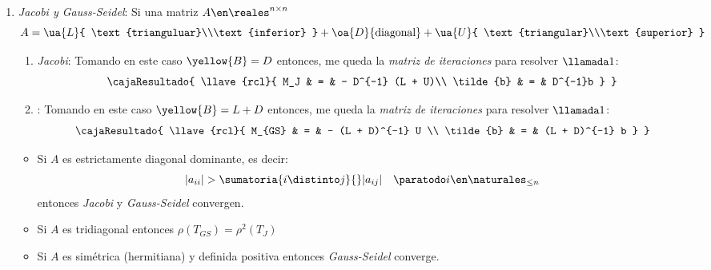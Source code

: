 \begin{enumerate}[label=\tiny\purple{\faIcon{snowman}}]
  \item \textit{Jacobi y Gauss-Seidel}:
        Si una matriz $A \en \reales^{n \times n}$
        $$
          A = \ua{L}{
            \text{trianguluar}\\\text{inferior}
          } +
          \oa{D}{
            \text{diagonal}
          } +
          \ua{U}{
            \text{triangular}\\\text{superior}
          }
        $$

        \begin{enumerate}[label=\tiny\violet{\faIcon{pray})}]

          \item \textit{Jacobi}: Tomando en este caso $\yellow{B} = D$
                entonces, me queda la \textit{matriz de iteraciones} para resolver $\llamada1$:
                $$
                  \cajaResultado{
                    \llave{rcl}{
                      M_J & = & - D^{-1} (L + U)\\
                      \tilde{b}   & = & D^{-1}b
                    }
                  }
                $$

          \item {}: Tomando en este caso $\yellow{B} = L + D$
                entonces, me queda la \textit{matriz de iteraciones} para resolver $\llamada1$:
                $$
                  \cajaResultado{
                    \llave{rcl}{
                      M_{GS} & = & - (L + D)^{-1} U \\
                      \tilde{b} & = & (L + D)^{-1} b
                    }
                  }
                $$
        \end{enumerate}

        \begin{itemize}
          \item Si $A$ es estrictamente diagonal dominante, es decir:
                $$
                  |a_{ii}| > \sumatoria{i \distinto j}{} |a_{ij}| \quad \paratodo i \en \naturales_{\leq n}
                $$
                entonces \textit{Jacobi} y \textit{Gauss-Seidel} convergen.

          \item Si $A$ es tridiagonal entonces $\rho(T_{GS}) = \rho^2(T_{J})$

          \item Si $A$ es simétrica (hermitiana) y definida positiva entonces \textit{Gauss-Seidel} converge.
        \end{itemize}

\end{enumerate}
